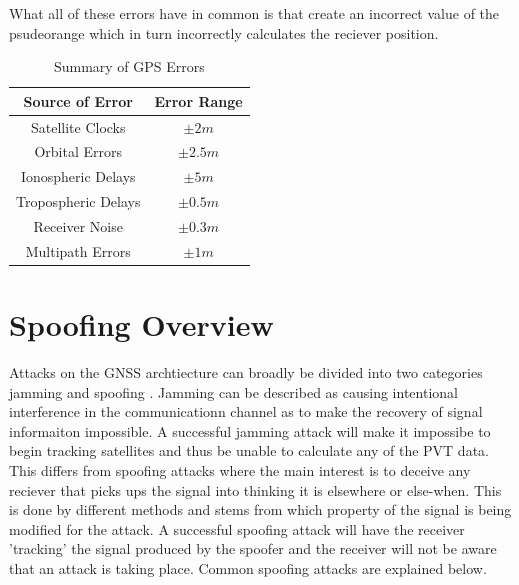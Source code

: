 What all of these errors have in common is that create an incorrect value of the psudeorange which in turn incorrectly calculates the reciever position.

\renewcommand{\arraystretch}{1.5}
\begin{table}
    \begin{center}
        \caption{Summary of GPS Errors}
        \label{tab:GPS Errors}
        \begin{tabular}{ |c|c| }
            \hline
            \textbf{Source of Error} & \textbf{Error Range} \\
            \hline
            Satellite Clocks & $\pm 2m$\\
            \hline
            Orbital Errors & $\pm 2.5m$\\
            \hline
            Ionospheric Delays & $\pm 5m$\\
            \hline
            Tropospheric Delays & $\pm 0.5m$\\
            \hline
            Receiver Noise & $\pm 0.3m$\\
            \hline
            Multipath Errors & $\pm 1m$\\
            \hline
        \end{tabular}
    \end{center}
\end{table}
\renewcommand{\arraystretch}{1}


\section{Spoofing Overview}
Attacks on the GNSS archtiecture can broadly be divided into two categories jamming and spoofing \cite{RN33} \cite{RN32}. Jamming can be described as causing intentional
interference in the communicationn channel as to make the recovery of signal informaiton impossible. A successful jamming attack will make it impossibe to begin tracking
satellites and thus be unable to calculate any of the PVT data. This differs from spoofing attacks where the main interest is to deceive any reciever that picks ups the
signal into thinking it is elsewhere or else-when. This is done by different methods and stems from which property of the signal is being modified for the attack. A
successful spoofing attack will have the receiver 'tracking' the signal produced by the spoofer and the receiver will not be aware that an attack is taking place. Common
spoofing attacks are explained below.

